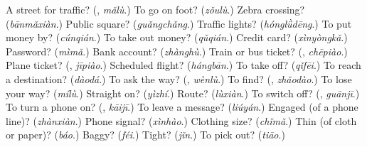 \begin{tcolorbox}[breakable,colback=teal!4,colframe=teal!35!black,title={Before you move on}]
A street for traffic? (\textbf{}, \emph{mǎlù}.) To go on foot? (\emph{zǒulù}.) Zebra crossing? (\emph{bānmǎxiàn}.) Public square? (\emph{guǎngchǎng}.) Traffic lights? (\emph{hónglǜdēng}.) To put money by? (\emph{cúnqián}.) To take out money? (\emph{qǔqián}.) Credit card? (\emph{xìnyòngkǎ}.) Password? (\emph{mìmǎ}.) Bank account? (\emph{zhànghù}.) Train or bus ticket? (\textbf{}, \emph{chēpiào}.) Plane ticket? (\textbf{}, \emph{jīpiào}.) Scheduled flight? (\emph{hángbān}.) To take off? (\emph{qǐfēi}.) To reach a destination? (\emph{dàodá}.) To ask the way? (\textbf{}, \emph{wènlù}.) To find? (\textbf{}, \emph{zhǎodào}.) To lose your way? (\emph{mílù}.) Straight on? (\emph{yìzhí}.) Route? (\emph{lùxiàn}.) To switch off? (\textbf{}, \emph{guānjī}.) To turn a phone on? (\textbf{}, \emph{kāijī}.) To leave a message? (\emph{liúyán}.) Engaged (of a phone line)? (\emph{zhànxiàn}.) Phone signal? (\emph{xìnhào}.) Clothing size? (\emph{chǐmǎ}.) Thin (of cloth or paper)? (\emph{báo}.) Baggy? (\emph{féi}.) Tight? (\emph{jǐn}.) To pick out? (\emph{tiāo}.)
\end{tcolorbox}
